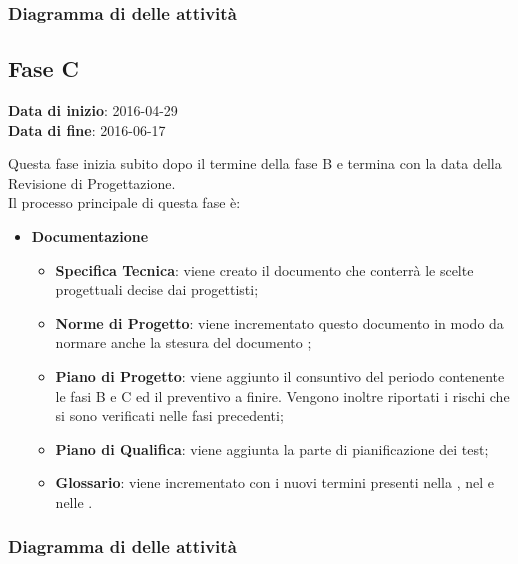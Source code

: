 		
		\subsubsection{Diagramma di  delle attività}
		
	\subsection{Fase C}
	\begin{center}
		\textbf{Data di inizio}: 2016-04-29 \\
		\textbf{Data di fine}: 2016-06-17 \\
	\end{center}
	Questa fase inizia subito dopo il termine della fase B e termina con la data della Revisione di Progettazione. \\
	Il processo principale di questa fase è:
		\begin{itemize}
			\item \textbf{Documentazione}
			\att
			\begin{itemize}
				\item \textbf{Specifica Tecnica}: viene creato il documento \STdocRP{} che conterrà le scelte progettuali decise dai progettisti; 
				\item \textbf{Norme di Progetto}: viene incrementato questo documento in modo da normare anche la stesura del documento \STdocRP;
				\item \textbf{Piano di Progetto}: viene aggiunto il consuntivo del periodo contenente le fasi B e C ed il preventivo a finire. Vengono inoltre riportati i rischi che si sono verificati nelle fasi precedenti;
				\item \textbf{Piano di Qualifica}: viene aggiunta la parte di pianificazione dei test;
				\item \textbf{Glossario}: viene incrementato con i nuovi termini presenti nella \STdocRP, nel \PQdocRP{} e nelle \NPdocRP.
			\end{itemize}
		\end{itemize}
		\subsubsection{Diagramma di  delle attività}
		
		
		
